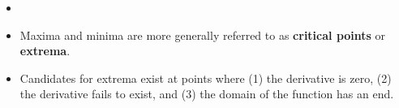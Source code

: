 \documentclass[../main.tex]{subfiles}
\begin{document}
\begin{itemize}
    \begin{align*}
        f'(a^+) &= \lim_{h\to 0^+}\frac{f(x+h)-f(x)}{h}&
        f'(b^-) &= \lim_{h]to 0^-}\frac{f(x+h)-f(x)}{h}
    \end{align*}
    may exist. These are called the \textbf{right-hand derivative} and \textbf{left-hand derivative} respectively.
    \begin{itemize}
        \item It's imprecise to say that $f$ is differentiable at these endpoints, but many mathematicians will allow it\footnote{Really?} as they expect us to just know that what is really meant is it is differentiable on $(a,b)$ and one-side differentiable at the endpoints.
    \end{itemize}
    \item {}
    \item Maxima and minima are more generally referred to as \textbf{critical points} or \textbf{extrema}.
    \item Candidates for extrema exist at points where (1) the derivative is zero, (2) the derivative fails to exist, and (3) the domain of the function has an end.
\end{itemize}
\end{document}
